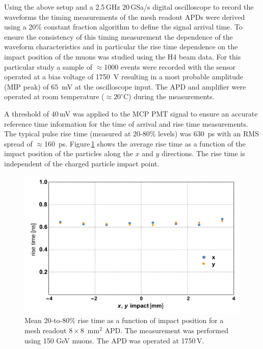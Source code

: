 \documentclass[review,number,sort&compress]{elsarticle}
\begin{document}
Using the above setup and a 2.5\,GHz 20\,GSa/s digital oscilloscope to record the waveforms the timing measurements of the mesh readout APDs were derived using a 20\% constant fraction algorithm to define the signal arrival time.
To ensure the consistency of this timing measurement the dependence of the waveform characteristics and in particular the rise time dependence on the impact position of the muons was studied using the H4 beam data.
For this particular study a sample of $\approx$1000 events were recorded with the sensor operated at a bias voltage of 1750~V resulting in a most probable amplitude (MIP peak) of 65~mV at the oscilloscope input.
The APD and amplifier were operated at room temperature ($\approx20^\circ$C) during the measurements.

A threshold of 40\,mV was applied to the MCP PMT signal to ensure an accurate reference time information for the time of arrival and rise time measurements.
The typical pulse rise time (measured at 20-80\% levels) was 630~ps with an RMS spread of $\approx$160~ps.
Figure\,\ref{fig:risetime8x8impact} shows the average rise time as a function of the impact position of the particles along the $x$ and $y$ directions.
The rise time is independent of the charged particle impact point.
\begin{figure}
  \centering
  \includegraphics[width = 0.6 \columnwidth]{risetime8x8vsImpact}
  \caption{Mean 20-to-80\% rise time as a function of impact position for a mesh readout $8 \times 8$~mm$^2$ APD. The measurement was performed using 150 GeV muons. The APD was operated at 1750\,V.}
  \label{fig:risetime8x8impact}
\end{figure}
\end{document}
